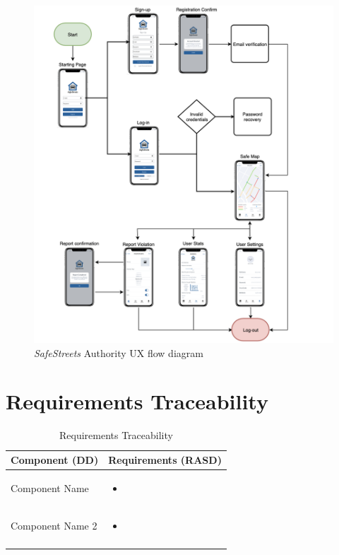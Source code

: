 \documentclass{article}
\begin{document}
	\begin{figure}[H]
			\centering
			\includegraphics[scale=0.5]{Images/UX/authority_ux_flow.png}
			\caption{{\it SafeStreets} Authority UX flow diagram}
	\end{figure}

\pagebreak

\section{Requirements Traceability}
	
	\begin{longtable}{| p{5 cm} | p{8 cm} |} \hline
		Component (DD) & Requirements (RASD)  \\ \hline
		\newline Component Name & 
		\begin{itemize}
			\item 
		\end{itemize}	\\ \hline
		\newline Component Name 2 & 
		\begin{itemize}
			\item  
		\end{itemize}		\\	 \hline				
		\caption{Requirements Traceability}	
		
	\end{longtable}
	
\end{document}
